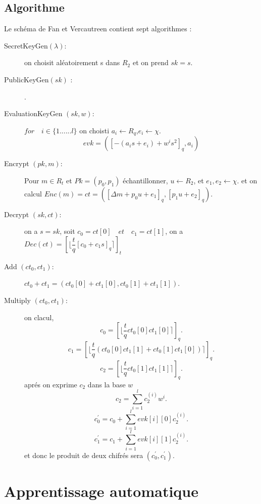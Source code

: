 \documentclass[a4paper,11pt]{report}
\begin{document}
\subsection*{Algorithme}
Le schéma de Fan et Vercautreen contient sept algorithmes : \newline
 \begin{description}
 \item[SecretKeyGen$(\lambda)$:]  on choisit aléatoirement s dans $R_2$ et on prend $sk=s$.
 \item[PublicKeyGen$(sk)$ :] .
 \item[EvaluationKeyGen $(sk, w)$:] $for\quad i\in \{1......l\}$ on choisti $a_i\xleftarrow{}{}R_q$,$e_i\xleftarrow{}{}\chi.$\newline
 $$evk = ([-(a_is+e_i)+w^is^2]_q, a_i)$$
 \item[Encrypt $(pk, m)$:] Pour $m \in R_t$ et $Pk = (p_0, p_1)$ échantillonner, $u\xleftarrow{}{} {R_2}$, et $e_1,e_2 \xleftarrow{}{} \chi$.
 \newline et on calcul $Enc(m) = ct = ([\Delta m + p_0 u + e_1]_q, [p_1 u + e_2]_q).$
 \item[Decrypt $(sk, ct)$:] on a $s = sk $, soit $c_0 = ct[0]\quad et\quad c_1 = ct[1]$, on a $Dec(ct) = [\lfloor\dfrac{t}{q}[c_0 + c_1 s]_q\rceil]_t$
 \item[Add  $(ct_0, ct_1)$:]  $ct_0 + ct_1 = (ct_0[0] + ct_1[0], ct_0[1] + ct_1[1])$.
 \item[Multiply $(ct_0, ct_1)$:] on clacul, \newline
 $$c_0 = [\lfloor\dfrac{t}{q}ct_0[0]ct_1[0]\rceil]_q.$$
 $$c_1 = [\lfloor\dfrac{t}{q}(ct_0[0]ct_1[1] + ct_0[1]ct_1[0])\rceil]_q.$$
 $$c_2 = [\lfloor\dfrac{t}{q}ct_0[1]ct_1[1]\rceil]_q .$$ 
 aprés on exprime $c_2 $ dans la base $w$ $$c_2 = \sum_{i=1}^{l}c_2^{(i)}w^i.$$
 $$c_0^{'} = c_0 + \sum_{i=1}^{l}evk[i][0]c_2^{(i)} .$$
 $$c_1^{'} = c_1 + \sum_{i=1}^{l}evk[i][1]c_2^{(i)} .$$
 et donc le produit de deux chifrés sera $(c_0^{'}, c_1^{'}).$
  \end{description}

\newpage
\section{Apprentissage automatique}
\end{document}
